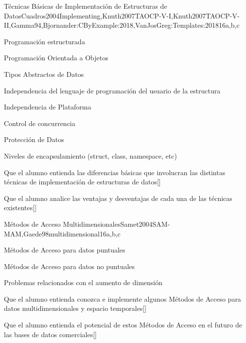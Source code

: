 \begin{syllabus}
\begin{unit}{Técnicas Básicas de Implementación de Estructuras de Datos}{}{Cuadros2004Implementing,Knuth2007TAOCP-V-I,Knuth2007TAOCP-V-II,Gamma94,Bjornander:CByExample:2018,VanJosGreg:Templates:2018}{16}{a,b,c}
   \begin{topics}
         \item Programación estructurada
         \item Programación Orientada a Objetos
         \item Tipos Abstractos de Datos
         \item Independencia del lenguaje de programación del usuario de la estructura
         \item Independencia de Plataforma
         \item Control de concurrencia
         \item Protección de Datos
         \item Niveles de encapsulamiento (struct, class, namespace, etc)
   \end{topics}
   \begin{learningoutcomes}
         \item Que el alumno entienda las diferencias básicas que involucran las distintas técnicas de implementación de estructuras de datos[\Usage]
         \item Que el alumno analice las ventajas y desventajas de cada una de las técnicas existentes[\Usage]
   \end{learningoutcomes}
\end{unit}

\begin{unit}{Métodos de Acceso Multidimensionales}{}{Samet2004SAM-MAM,Gaede98multidimensional}{16}{a,b,c}
   \begin{topics}
         \item Métodos de Acceso para datos puntuales
         \item Métodos de Acceso para datos no puntuales
         \item Problemas relacionados con el aumento de dimensión
   \end{topics}
   \begin{learningoutcomes}
         \item Que el alumno entienda conozca e implemente algunos Métodos de Acceso para datos multidimensionales y espacio temporales[\Usage]
         \item Que el alumno entienda el potencial de estos Métodos de Acceso en el futuro de las bases de datos comerciales[\Usage]
   \end{learningoutcomes}
\end{unit}


\end{syllabus}
